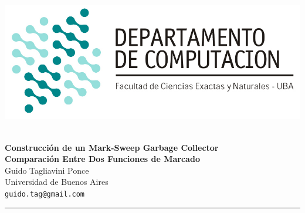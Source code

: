 \hfill \includegraphics[scale = 0.75]{imagenes/logo_dc.jpg}~\\[0.25cm]

\begin{center}
	\textbf{\Large Construcción de un Mark-Sweep Garbage Collector}\\[0.2cm] \textbf{Comparación Entre Dos Funciones de Marcado}\\[1cm]
	{\large Guido Tagliavini Ponce\\[0.15cm]}
	Universidad de Buenos Aires\\[0.15cm]
	\texttt{guido.tag@gmail.com}\\[1cm]
\end{center}
\rule{\linewidth}{0.2mm}